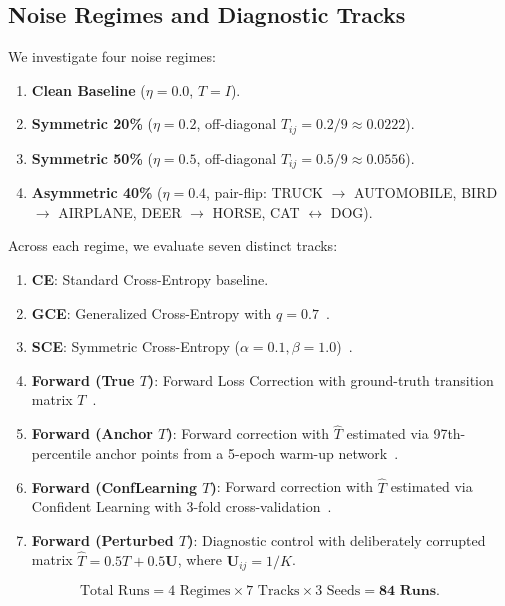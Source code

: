 \documentclass[10pt,twocolumn]{article}
\theoremstyle{definition}
\begin{document}
\subsection{Noise Regimes and Diagnostic Tracks}
We investigate four noise regimes:
\begin{enumerate}
    \item \textbf{Clean Baseline} ($\eta = 0.0$, $T = I$).
    \item \textbf{Symmetric 20\%} ($\eta = 0.2$, off-diagonal $T_{ij} = 0.2/9 \approx 0.0222$).
    \item \textbf{Symmetric 50\%} ($\eta = 0.5$, off-diagonal $T_{ij} = 0.5/9 \approx 0.0556$).
    \item \textbf{Asymmetric 40\%} ($\eta = 0.4$, pair-flip: TRUCK $\to$ AUTOMOBILE, BIRD $\to$ AIRPLANE, DEER $\to$ HORSE, CAT $\leftrightarrow$ DOG).
\end{enumerate}

Across each regime, we evaluate seven distinct tracks:
\begin{enumerate}
    \item \textbf{CE}: Standard Cross-Entropy baseline.
    \item \textbf{GCE}: Generalized Cross-Entropy with $q = 0.7$~\cite{zhang2018generalized}.
    \item \textbf{SCE}: Symmetric Cross-Entropy ($\alpha = 0.1, \beta = 1.0$)~\cite{wang2019symmetric}.
    \item \textbf{Forward (True $T$)}: Forward Loss Correction with ground-truth transition matrix $T$~\cite{patrini2017making}.
    \item \textbf{Forward (Anchor $T$)}: Forward correction with $\hat{T}$ estimated via 97th-percentile anchor points from a 5-epoch warm-up network~\cite{patrini2017making}.
    \item \textbf{Forward (ConfLearning $T$)}: Forward correction with $\hat{T}$ estimated via Confident Learning with 3-fold cross-validation~\cite{northcutt2021confident}.
    \item \textbf{Forward (Perturbed $T$)}: Diagnostic control with deliberately corrupted matrix $\hat{T} = 0.5 T + 0.5 \mathbf{U}$, where $\mathbf{U}_{ij} = 1/K$.
\end{enumerate}
$$\text{Total Runs} = 4 \text{ Regimes} \times 7 \text{ Tracks} \times 3 \text{ Seeds} = \mathbf{84 \text{ Runs}}.$$
\end{document}
